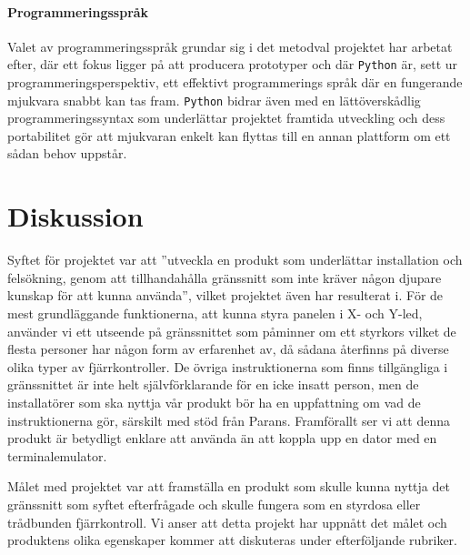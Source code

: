 \documentclass{article}
\begin{document}
            \paragraph{\textrm{Programmeringsspråk}} %
            \label{par:programmeringssprak}
               Valet av programmeringsspråk grundar sig i det metodval projektet har arbetat efter, där ett fokus ligger på att producera prototyper och där \texttt{Python} är, sett ur programmeringsperspektiv, ett effektivt programmerings språk där en fungerande mjukvara snabbt kan tas fram. \texttt{Python} bidrar även med en lättöverskådlig prog\-ram\-merings\-syntax som underlättar projektet framtida utveckling och dess portabilitet gör att mjukvaran enkelt kan flyttas till en annan plattform om ett sådan behov uppstår. 
        


    \newpage

    \section{Diskussion} %
    \label{sec:diskussion}

        Syftet för projektet var att ''utveckla en produkt som underlättar installation och felsök\-ning, genom att tillhandahålla gränssnitt som inte kräver någon djupare kunskap för att kunna använda'', vilket projektet även har resulterat i. För de mest grundläggande funktionerna, att kunna styra panelen i X- och Y-led, använder vi ett utseende på gränssnittet som påminner om ett styrkors vilket de flesta personer har någon form av erfarenhet av, då sådana återfinns på diverse olika typer av fjärrkontroller. De övriga instruktionerna som finns tillgängliga i gränssnittet är inte helt självförklarande för en icke insatt person, men de installatörer som ska nyttja vår produkt bör ha en uppfattning om vad de instruktionerna gör, särskilt med stöd från Parans. Framförallt ser vi att denna produkt är betydligt enklare att använda än att koppla upp en dator med en terminalemulator. \bigskip

        \noindent Målet med projektet var att framställa en produkt som skulle kunna nyttja det gränssnitt som syftet efterfrågade och skulle fungera som en styrdosa eller trådbunden fjärrkontroll. Vi anser att detta projekt har uppnått det målet och produktens olika egenskaper kommer att diskuteras under efterföljande rubriker.
\end{document}
